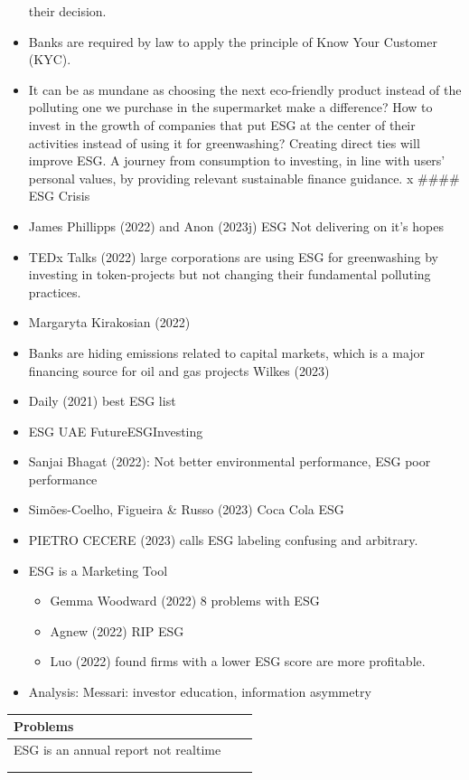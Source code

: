 \documentclass[
  letterpaper,
  DIV=11,
  numbers=noendperiod]{scrartcl}
\providecommand{\tightlist}{%
  \setlength{\itemsep}{0pt}\setlength{\parskip}{0pt}}\usepackage{longtable,booktabs,array}
\begin{document}
\begin{itemize}
  their decision.
\item
  Banks are required by law to apply the principle of Know Your Customer
  (KYC).
\item
  It can be as mundane as choosing the next eco-friendly product instead
  of the polluting one we purchase in the supermarket make a difference?
  How to invest in the growth of companies that put ESG at the center of
  their activities instead of using it for greenwashing? Creating direct
  ties will improve ESG. A journey from consumption to investing, in
  line with users' personal values, by providing relevant sustainable
  finance guidance. x \#\#\#\# ESG Crisis
\item
  James Phillipps (2022) and Anon (2023j) ESG Not delivering on it's
  hopes
\item
  TEDx Talks (2022) large corporations are using ESG for greenwashing by
  investing in token-projects but not changing their fundamental
  polluting practices.
\item
  Margaryta Kirakosian (2022)
\item
  Banks are hiding emissions related to capital markets, which is a
  major financing source for oil and gas projects Wilkes (2023)
\item
  Daily (2021) best ESG list
\item
  ESG UAE FutureESGInvesting
\item
  Sanjai Bhagat (2022): Not better environmental performance, ESG poor
  performance
\item
  Simões-Coelho, Figueira \& Russo (2023) Coca Cola ESG
\item
  PIETRO CECERE (2023) calls ESG labeling confusing and arbitrary.
\item
  ESG is a Marketing Tool

  \begin{itemize}
  \tightlist
  \item
    Gemma Woodward (2022) 8 problems with ESG
  \item
    Agnew (2022) RIP ESG
  \item
    Luo (2022) found firms with a lower ESG score are more profitable.
  \end{itemize}
\item
  Analysis: Messari: investor education, information asymmetry
\end{itemize}

\begin{longtable}[]{@{}lll@{}}
\toprule\noalign{}
Problems & & \\
\midrule\noalign{}
\endhead
\bottomrule\noalign{}
\endlastfoot
ESG is an annual report not realtime & & \\
& & \\
& & \\
\end{longtable}
\end{document}
